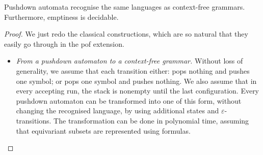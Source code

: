 \begin{theorem}\label{thm:pof-equality-pushdown}
	Pushdown automata recognise the same languages as context-free grammars. 
	Furthermore, emptiness is decidable.
\end{theorem}
\begin{proof}
We just redo the classical constructions, which are so natural  that they easily go through in the pof extension. 
	\begin{itemize}
		\item \emph{From a pushdown automaton to a context-free grammar.} Without loss of generality, we assume that each transition either: pops nothing and pushes one symbol; or pops one symbol and pushes nothing.  We also assume that in every accepting run, the stack is nonempty until the last configuration.  Every pushdown automaton can be transformed into one of this form, without changing the recognised language, by using additional states and $\varepsilon$-transitions. The transformation can be done in polynomial time, assuming that equivariant subsets are represented using formulas.
		

\end{itemize}
\end{proof}
